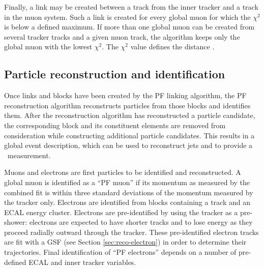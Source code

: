 Finally, a link may be created between a track from the inner tracker
and a track in the muon system.  Such a link is created for every
global muon for which the $\chi^2$ is below a defined maximum.  
If more than one global muon can be created from several tracker 
tracks and a given muon track, the algorithm keeps only the global 
muon with the lowest $\chi^2$.  The $\chi^2$ value defines the distance \cite{pf-1}.

\subsection{Particle reconstruction and identification}

Once links and blocks have been created by the PF linking 
algorithm, the PF reconstruction algorithm reconstructs 
particles from those blocks and identifies them.  After the reconstruction
algorithm has reconstructed a particle candidate, the corresponding 
block and its constituent elements are removed from consideration while constructing
additional particle candidates.
This results in a global event description, which can be used to 
reconstruct jets and to provide a \met~measurement.

Muons and electrons are first particles to be identified and reconstructed.
A global muon is identified as a ``PF muon'' if its 
momentum as measured by the combined fit is within three standard deviations
of the momentum measured by the tracker only.  Electrons are identified from blocks
containing a track and an ECAL energy cluster.  Electrons are pre-identified 
by using the tracker as a pre-shower: electrons are expected to have shorter
tracks and to lose energy as they proceed radially outward through the tracker.
These pre-identified electron tracks are fit with a GSF (see Section \ref{sec:reco-electron})
in order to determine their
trajectories.  Final identification of ``PF electrons'' depends on a number of pre-defined ECAL 
and inner tracker variables.

